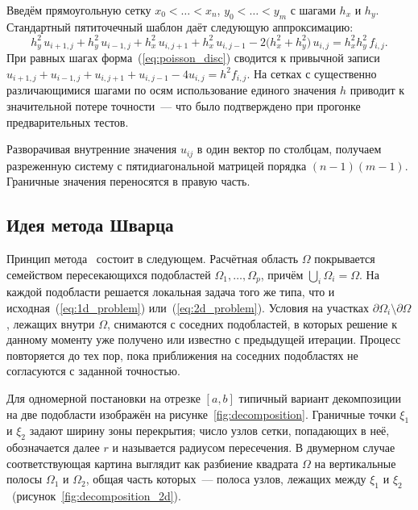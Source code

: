 Введём прямоугольную сетку $x_0<\dots<x_n$, $y_0<\dots<y_m$ с шагами $h_x$ и
$h_y$. Стандартный пятиточечный шаблон даёт следующую аппроксимацию:
\begin{equation}\label{eq:poisson_disc}
    h_y^2\,u_{i+1,j} + h_y^2\,u_{i-1,j}
    + h_x^2\,u_{i,j+1} + h_x^2\,u_{i,j-1}
    - 2\bigl(h_x^2+h_y^2\bigr)\,u_{i,j}
    = h_x^2 h_y^2\,f_{i,j}.
\end{equation}
При равных шагах форма~(\ref{eq:poisson_disc}) сводится к привычной записи
$u_{i+1,j}+u_{i-1,j}+u_{i,j+1}+u_{i,j-1}-4u_{i,j}=h^2 f_{i,j}$. На сетках с
существенно различающимися шагами по осям использование единого значения $h$
приводит к значительной потере точности~--- что было подтверждено при
прогонке предварительных тестов.

Разворачивая внутренние значения $u_{ij}$ в один вектор по столбцам,
получаем разреженную систему с пятидиагональной матрицей порядка
$(n-1)(m-1)$. Граничные значения переносятся в правую часть.

\subsection{Идея метода Шварца}

Принцип метода~\cite{schwarz1870} состоит в следующем. Расчётная область
$\Omega$ покрывается семейством пересекающихся подобластей
$\Omega_1,\dots,\Omega_p$, причём $\bigcup_i \Omega_i = \Omega$. На каждой
подобласти решается локальная задача того же типа, что и
исходная~(\ref{eq:1d_problem}) или~(\ref{eq:2d_problem}). Условия на
участках $\partial\Omega_i\setminus\partial\Omega$, лежащих внутри $\Omega$,
снимаются с соседних подобластей, в которых решение к данному моменту уже
получено или известно с предыдущей итерации. Процесс повторяется до тех пор,
пока приближения на соседних подобластях не согласуются с заданной точностью.

Для одномерной постановки на отрезке $[a,b]$ типичный вариант декомпозиции
на две подобласти изображён на рисунке~\ref{fig:decomposition}. Граничные
точки $\xi_1$ и $\xi_2$ задают ширину зоны перекрытия; число узлов сетки,
попадающих в неё, обозначается далее $r$ и называется радиусом пересечения.
В двумерном случае соответствующая картина выглядит как разбиение квадрата
$\Omega$ на вертикальные полосы $\Omega_1$ и $\Omega_2$, общая часть
которых~--- полоса узлов, лежащих между $\xi_1$ и
$\xi_2$~(рисунок~\ref{fig:decomposition_2d}).

